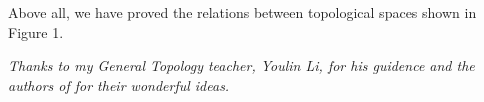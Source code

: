 \documentclass[11pt]{diazessay} %
\begin{document}
\vskip 10pt
Above all, we have proved the relations between topological spaces shown in Figure 1.

\vskip 25pt
\textit{Thanks to my General Topology teacher, Youlin Li, for his guidence and the authors of \cite{1}\cite{2}\cite{3} for their wonderful ideas.}

%
\vskip 30pt


\end{document}
